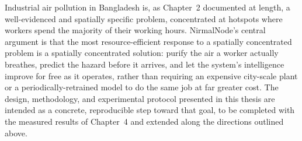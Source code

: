 Industrial air pollution in Bangladesh is, as Chapter~2 documented at length, a well-evidenced and spatially specific problem, concentrated at hotspots where workers spend the majority of their working hours. NirmalNode's central argument is that the most resource-efficient response to a spatially concentrated problem is a spatially concentrated solution: purify the air a worker actually breathes, predict the hazard before it arrives, and let the system's intelligence improve for free as it operates, rather than requiring an expensive city-scale plant or a periodically-retrained model to do the same job at far greater cost. The design, methodology, and experimental protocol presented in this thesis are intended as a concrete, reproducible step toward that goal, to be completed with the measured results of Chapter~4 and extended along the directions outlined above.
